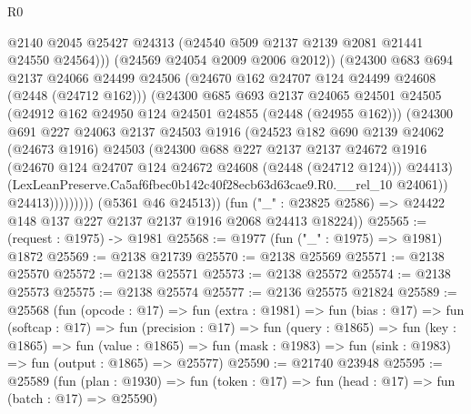 \begin{lexlean}{R0}
\begin{coremodule}
                          @2140
                          @2045
                          @25427
                          @24313
                          (@24540 @509 @2137 @2139 @2081 @21441 @24550 @24564)))
                      (@24569 @24054 @2009 @2006 @2012))
                    (@24300
                      @683
                      @694
                      @2137
                      @24066
                      @24499
                      @24506
                      (@24670 @162 @24707 @124 @24499 @24608 (@2448 (@24712 @162)))
                      (@24300
                        @685
                        @693
                        @2137
                        @24065
                        @24501
                        @24505
                        (@24912 @162 @24950 @124 @24501 @24855 (@2448 (@24955 @162)))
                        (@24300
                          @691
                          @227
                          @24063
                          @2137
                          @24503
                          @1916
                          (@24523
                            @182
                            @690
                            @2139
                            @24062
                            (@24673 @1916)
                            @24503
                            (@24300
                              @688
                              @227
                              @2137
                              @2137
                              @24672
                              @1916
                              (@24670 @124 @24707 @124 @24672 @24608 (@2448 (@24712 @124)))
                              @24413)
                            (LexLeanPreserve.Ca5af6fbec0b142c40f28ecb63d63cae9.R0.__rel_10 @24061))
                          @24413)))))))))
        (@5361 @46 @24513))
      (fun ("_" : @23825 @2586) => @24422 @148 @137 @227 @2137 @2137 @1916 @2068 @24413 @18224))
@25565 := (request : @1975) -> @1981
@25568 := @1977 (fun ("_" : @1975) => @1981) @1872
@25569 := @2138 @21739
@25570 := @2138 @25569
@25571 := @2138 @25570
@25572 := @2138 @25571
@25573 := @2138 @25572
@25574 := @2138 @25573
@25575 := @2138 @25574
@25577 := @2136 @25575 @21824
@25589 := @25568
    (fun (opcode : @17) =>
    fun (extra : @1981) =>
    fun (bias : @17) =>
    fun (softcap : @17) =>
    fun (precision : @17) =>
    fun (query : @1865) =>
    fun (key : @1865) =>
    fun (value : @1865) =>
    fun (mask : @1983) => fun (sink : @1983) => fun (output : @1865) => @25577)
@25590 := @21740 @23948
@25595 := @25589
    (fun (plan : @1930) => fun (token : @17) => fun (head : @17) => fun (batch : @17) => @25590)

\end{coremodule}
\end{lexlean}
